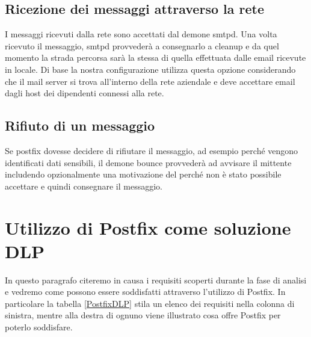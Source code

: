   \subsection{Ricezione dei messaggi attraverso la rete}
  I messaggi ricevuti dalla rete sono accettati dal demone smtpd. Una volta ricevuto il messaggio, smtpd provvederà a consegnarlo a cleanup e da quel momento la strada percorsa sarà la stessa di quella effettuata dalle email ricevute in locale.
  Di base la nostra configurazione utilizza questa opzione considerando che il mail server si trova all'interno della rete aziendale e deve accettare email dagli host dei dipendenti connessi alla rete.
  
  \subsection{Rifiuto di un messaggio}
  Se postfix dovesse decidere di rifiutare il messaggio, ad esempio perché vengono identificati dati sensibili, il demone bounce provvederà ad avvisare il mittente includendo opzionalmente una motivazione del perché non è stato possibile accettare e quindi consegnare il messaggio.
  
  \section{Utilizzo di Postfix come soluzione DLP}
  In questo paragrafo citeremo in causa i requisiti scoperti durante la fase di analisi e vedremo come
  possono essere soddisfatti attraverso l'utilizzo di Postfix. In particolare la tabella
  \ref{PostfixDLP} stila un elenco dei requisiti nella colonna di sinistra, mentre alla destra di ognuno viene illustrato
  cosa offre Postfix per poterlo soddisfare.
  
   
  
  
  
